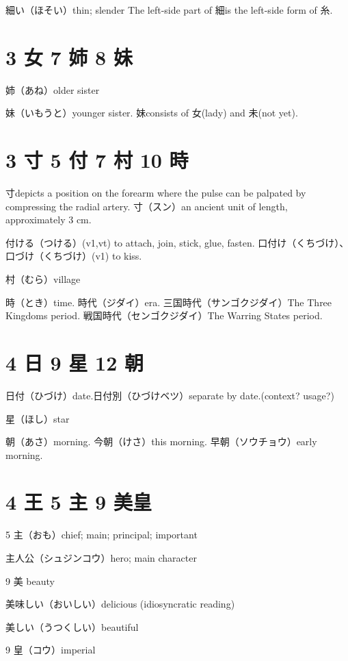 細い（ほそい）thin; slender
The left-side part of 細is the left-side form of 糸.

\section{3 女 7 姉 8 妹}

姉（あね）older sister

妹（いもうと）younger sister.
妹consists of 女(lady) and 未(not yet).

\section{3 寸 5 付 7 村 10 時}

寸depicts a position on the forearm
where the pulse can be palpated by compressing the radial artery.
寸（スン）an ancient unit of length, approximately 3 cm.

付ける（つける）(v1,vt) to attach, join, stick, glue, fasten.
口付け（くちづけ）、口づけ（くちづけ）(v1) to kiss.

村（むら）village

時（とき）time.
時代（ジダイ）era.
三国時代（サンゴクジダイ）The Three Kingdoms period.
戦国時代（センゴクジダイ）The Warring States period.

\section{4 日 9 星 12 朝}

日付（ひづけ）date.日付別（ひづけベツ）separate by date.(context? usage?)

星（ほし）star

朝（あさ）morning.
今朝（けさ）this morning.
早朝（ソウチョウ）early morning.

\section{4 王 5 主 9 美皇}

5 主（おも）chief; main; principal; important

主人公（シュジンコウ）hero; main character

9 美 beauty

美味しい（おいしい）delicious (idiosyncratic reading)

美しい（うつくしい）beautiful

9 皇（コウ）imperial

